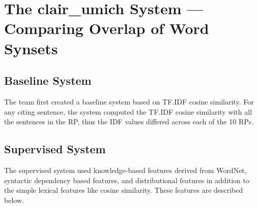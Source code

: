 \documentclass[11pt]{article}
\begin{document}
\section{The clair\_umich System --- Comparing Overlap of Word Synsets}
\label{s:umich}

\subsection{Baseline System}


The team first created a baseline system based on TF.IDF cosine similarity. For any citing sentence, the system computed the TF.IDF
cosine similarity with all the sentences in the RP, thus the IDF values differed across each of the 10 RPs.

\subsection{Supervised System}
The supervised system used knowledge-based features derived from WordNet, syntactic dependency based features, and distributional features in addition to the simple lexical features like cosine similarity. These features are described below.
\end{document}
